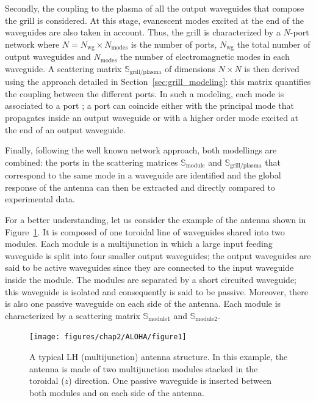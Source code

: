 Secondly, the coupling to the plasma of all the output waveguides that compose the grill is considered. At this stage, evanescent modes excited at the end of the waveguides are also taken in account. Thus, the grill is characterized by a $N$-port network where $N=N_{\mbox{wg}}\times N_{\mbox{modes}}$ is the number of ports, $N_{\mbox{wg}}$ the total number of output waveguides and $N_{\mbox{modes}}$ the number of electromagnetic modes in each waveguide. A scattering matrix $\mathbb{S}_{\mbox{grill/plasma}}$ of dimensions $N\times N$ is then derived using the approach detailed in Section~\ref{sec:grill_modeling}: this matrix quantifies the coupling between the different ports. In such a modeling, each mode is associated to a port \cite{Harrington2001}; a port can coincide either with the principal mode that propagates inside an output waveguide or with a higher order mode excited at the end of an output waveguide. 

Finally, following the well known network approach, both modellings are combined: the ports in the scattering matrices $\mathbb{S}_{\mbox{module}}$ and $\mathbb{S}_{\mbox{grill/plasma}}$ that correspond to the same mode in a waveguide are identified and the global response of the antenna can then be extracted and directly compared to experimental data.

For a better understanding, let us consider the example of the antenna shown in Figure~\ref{fig:geometry_antenna}. It is composed of one toroidal line of waveguides shared into two modules. Each module is a multijunction in which a large input feeding waveguide is split into four smaller output waveguides; the output waveguides are said to be active waveguides since they are connected to the input waveguide inside the module. The modules are separated by a short circuited waveguide; this waveguide is isolated and consequently is said to be passive. Moreover, there is also one passive waveguide on each side of the antenna. Each module is characterized by a scattering matrix $\mathbb{S}_{\mbox{module1}}$ and $\mathbb{S}_{\mbox{module2}}$.

%
\begin{figure}[h]
	\centering{}\texttt{[image: figures/chap2/ALOHA/figure1]} 
	\caption{A typical LH (multijunction) antenna structure. In this example, the
		antenna is made of two multijunction modules stacked in the toroidal
		($z$) direction. One passive waveguide is inserted between both modules
		and on each side of the antenna.\label{fig:geometry_antenna} }
	
\end{figure}


